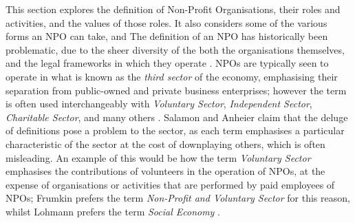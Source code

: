 This section explores the definition of Non-Profit Organisations, their roles and activities, and the values of those roles. It also considers some of the various forms an NPO can take, and
%
The definition of an NPO has historically been problematic, due to the sheer diversity of the both the organisations themselves, and the legal frameworks in which they operate \cite{salamon_search_1992}. NPOs are typically seen to operate in what is known as the \textit{third sector} of the economy, emphasising their separation from public-owned and private business enterprises; however the term is often used interchangeably with \textit{Voluntary Sector}, \textit{Independent Sector}, \textit{Charitable Sector}, and many others \cite{evers_third_2004, salamon_search_1992}. Salamon and Anheier claim that the deluge of definitions pose a problem to the sector, as each term emphasises a particular characteristic of the sector at the cost of downplaying others, which is often misleading. An example of this would be how the term \textit{Voluntary Sector} emphasises the contributions of volunteers in the operation of NPOs, at the expense of organisations or activities that are performed by paid employees of NPOs; Frumkin prefers the term \textit{Non-Profit and Voluntary Sector} for this reason, whilst Lohmann prefers the term \textit{Social Economy} \cite{frumkin_being_2009, salamon_search_1992, lohmann_charity_2007}.
%
